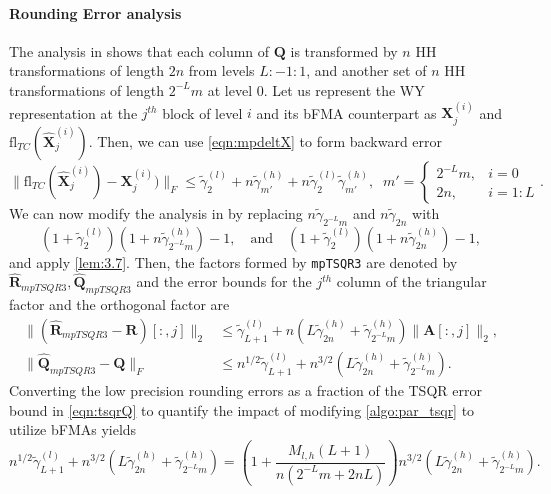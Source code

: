 \documentclass[review,onefignum,onetabnum]{siamart190516}
\newcommand{\bb}[1]{\mathbf{#1}}
\newcommand{\fl}{\mathrm{fl}}
\begin{document}
\paragraph{Rounding Error analysis} The analysis in \cite{Mori2012} shows that each column of $\bb{Q}$ is transformed by $n$ HH transformations of length $2n$ from levels $L:-1:1$, and another set of $n$ HH transformations of length $2^{-L}m$ at level $0$.
Let us represent the WY representation at the $j^{th}$ block of level $i$ and its bFMA counterpart as $\bb{X}_j^{(i)}$ and $\fl_{TC}(\hat{\bb{X}}_j^{(i)})$.
Then, we can use \cref{eqn:mpdeltX} to form backward error  
\begin{equation}
	\|\fl_{TC}(\hat{\bb{X}}_j^{(i)})-\bb{X}_j^{(i)})\|_F \leq \tilde{\gamma}_2^{(l)} +n\tilde{\gamma}_{m'}^{(h)} + n\tilde{\gamma}_2^{(l)}\tilde{\gamma}_{m'}^{(h)}, \;\; m' = \begin{cases}
	2^{-L}m, &i=0\\
	2n, & i = 1 : L
	\end{cases}.
\end{equation}
We can now modify the analysis in \cite{Mori2012} by replacing $n\tilde{\gamma}_{2^{-L}m}$ and $n\tilde{\gamma}_{2n}$ with \[(1+\tilde{\gamma}_2^{(l)})(1+n\tilde{\gamma}_{2^{-L}m}^{(h)})-1,\quad\text{and}\quad (1+\tilde{\gamma}_2^{(l)})(1+n\tilde{\gamma}_{2n}^{(h)})-1,\]
and apply \cref{lem:3.7}.
Then, the factors formed by {\tt mpTSQR3} are denoted by $\hat{\bb{R}}_{mpTSQR3},\hat{\bb{Q}}_{mpTSQR3}$ and the error bounds for the $j^{th}$ column of the triangular factor and the orthogonal factor are
\begin{align*}
\|(\hat{\bb{R}}_{mpTSQR3}- \bb{R})[:,j]\|_2 &\leq \tilde{\gamma}_{L+1}^{(l)}+n\left(L\tilde{\gamma}_{2n}^{(h)}+\tilde{\gamma}_{2^{-L}m}^{(h)}\right)\|\bb{A}[:,j]\|_2\label{eqn:mpTSQR1},\\
	\|\hat{\bb{Q}}_{mpTSQR3} - \bb{Q}\|_F &\leq n^{1/2}\tilde{\gamma}_{L+1}^{(l)}+n^{3/2}\left(L\tilde{\gamma}_{2n}^{(h)}+\tilde{\gamma}_{2^{-L}m}^{(h)}\right).
\end{align*}
Converting the low precision rounding errors as a fraction of the TSQR error bound in \cref{eqn:tsqrQ} to quantify the impact of modifying \cref{algo:par_tsqr} to utilize bFMAs yields
\begin{equation}
	n^{1/2}\tilde{\gamma}_{L+1}^{(l)}+n^{3/2}\left(L\tilde{\gamma}_{2n}^{(h)}+\tilde{\gamma}_{2^{-L}m}^{(h)}\right) = \left(1+ \frac{M_{l,h}(L+1)}{n(2^{-L}m+2nL)}\right)n^{3/2}\left(L\tilde{\gamma}_{2n}^{(h)}+\tilde{\gamma}_{2^{-L}m}^{(h)}\right).\label{eqn:mpTSQR3}
\end{equation}
\end{document}
